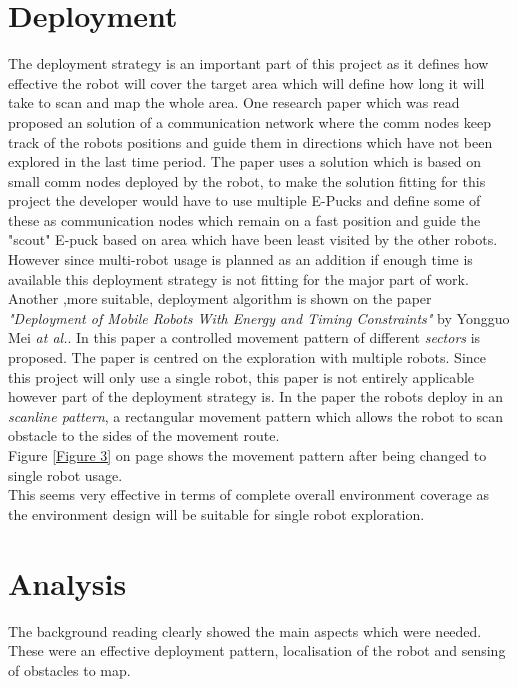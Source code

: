 \section{Deployment}
The deployment strategy is an important part of this project as it defines how effective the robot will cover the target area which will define how long it will take to scan and map the whole area. 
One research paper which was read proposed an solution of a communication network where the comm nodes keep track of the robots positions and guide them in directions which have not been explored in the last time period\cite{Batalin2003Coverage}. The paper uses a solution which is based on small comm nodes deployed by the robot, to make the solution fitting for this project the developer would have to use multiple E-Pucks and define some of these as communication nodes which remain on a fast position and guide the "scout" E-puck based on area which have been least visited by the other robots.\\ 
However since multi-robot usage is planned as an addition if enough time is available this deployment strategy is not fitting for the major part of work.\\[3ex]

Another ,more suitable, deployment algorithm is shown on the paper \textit{"Deployment of Mobile Robots With Energy and Timing Constraints"} by Yongguo Mei \textit{at al.}\cite{Mei2006Deployment}. In this paper a controlled movement pattern of different \textit{sectors} is proposed. The paper is centred on the exploration with multiple robots. Since this project will only use a single robot, this paper is not entirely applicable however part of the deployment strategy is. In the paper the robots deploy in an \textit{scanline pattern}, a rectangular movement pattern which allows the robot to scan obstacle to the sides of the movement route. \\
Figure \ref{Figure 3} on page \pageref{Figure 3} shows the movement pattern after being changed to single robot usage.\\
This seems very effective in terms of complete overall environment coverage as the environment design will be suitable for single robot exploration.

\section{Analysis}
The background reading clearly showed the main aspects which were needed.\\
These were an effective deployment pattern, localisation of the robot and sensing of obstacles to map. 

